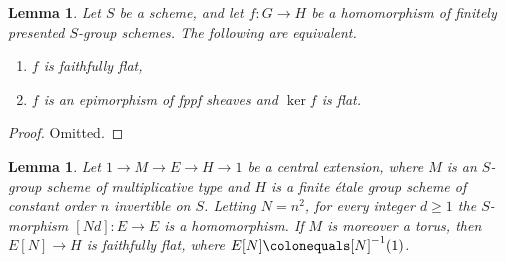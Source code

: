 \documentclass[11pt, letterpaper,english]{amsart}
\theoremstyle{plain}
\newtheorem{lemma}[lem]{Lemma}
\theoremstyle{definition}
\numberwithin{equation}{section}
\numberwithin{lem}{section}
\begin{document}
\begin{lemma}\label{lemma:faithfully-flat-criterion}
Let $S$ be a scheme, and let $f: G \to H$ be a homomorphism of finitely presented $S$-group schemes. The following are equivalent.
\begin{enumerate}
    \item $f$ is faithfully flat,
    \item $f$ is an epimorphism of fppf sheaves and $\ker f$ is flat.
\end{enumerate}
\end{lemma}

\begin{proof}
Omitted. 
\end{proof}


\begin{lemma}\label{lemma:power-homomorphism}
Let $1 \to M \to E \to H \to 1$ be a central extension, where $M$ is an $S$-group scheme of multiplicative type and $H$ is a finite \'{e}tale group scheme of constant order $n$ invertible on $S$. Letting $N = n^2$, for every integer $d \geq 1$ the $S$-morphism $[Nd]: E \to E$ is a homomorphism. If $M$ is moreover a torus, then $E[N] \to H$ is faithfully flat, where $E[N] \colonequals [N]^{-1}(1)$.
\end{lemma}
\end{document}
